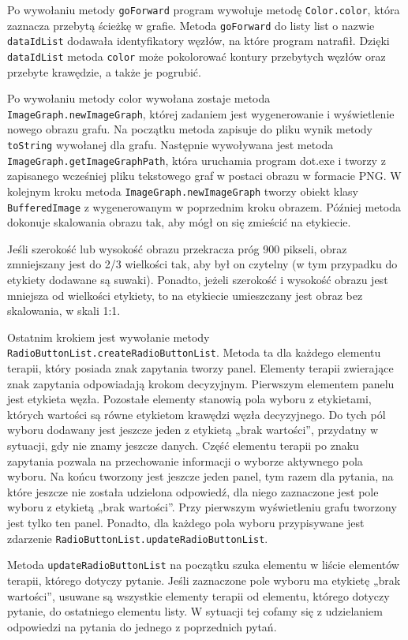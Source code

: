 Po wywołaniu metody \texttt{goForward} program wywołuje metodę \texttt{Color.color}, która zaznacza przebytą ścieżkę w grafie. Metoda \texttt{goForward} do listy list o nazwie \texttt{dataIdList} dodawała identyfikatory węzłów, na które program natrafił. Dzięki \texttt{dataIdList} metoda \texttt{color} może pokolorować kontury przebytych węzłów oraz przebyte krawędzie, a także je pogrubić. 
 
Po wywołaniu metody color wywołana zostaje metoda \texttt{ImageGraph.newImageGraph}, której zadaniem jest wygenerowanie i wyświetlenie nowego obrazu grafu. Na początku metoda zapisuje do pliku wynik metody \texttt{toString} wywołanej dla grafu. Następnie wywoływana jest metoda \texttt{ImageGraph.getImageGraphPath}, która uruchamia program dot.exe i tworzy z zapisanego wcześniej pliku tekstowego graf w postaci obrazu w formacie PNG. W kolejnym kroku metoda \texttt{ImageGraph.newImageGraph} tworzy obiekt klasy \texttt{BufferedImage} z wygenerowanym w poprzednim kroku obrazem. Później metoda dokonuje skalowania obrazu tak, aby mógł on się zmieścić na etykiecie. 

Jeśli szerokość lub wysokość obrazu przekracza próg 900 pikseli, obraz zmniejszany jest do 2/3 wielkości tak, aby był on czytelny (w tym przypadku do etykiety dodawane są suwaki). Ponadto, jeżeli szerokość i wysokość obrazu jest mniejsza od wielkości etykiety, to na etykiecie umieszczany jest obraz bez skalowania, w skali 1:1.
 
Ostatnim krokiem jest wywołanie metody \texttt{RadioButtonList.createRadioButtonList}. Metoda ta dla każdego elementu terapii, który posiada znak zapytania tworzy panel. Elementy terapii zwierające znak zapytania odpowiadają krokom decyzyjnym. Pierwszym elementem panelu jest etykieta węzła. Pozostałe elementy stanowią pola wyboru z etykietami, których wartości są równe etykietom krawędzi węzła decyzyjnego. Do tych pól wyboru dodawany jest jeszcze jeden z etykietą „brak wartości”, przydatny w sytuacji, gdy nie znamy jeszcze danych. Część elementu terapii po znaku zapytania pozwala na przechowanie informacji o wyborze aktywnego pola wyboru. Na końcu tworzony jest jeszcze jeden panel, tym razem dla pytania, na które jeszcze nie została udzielona odpowiedź, dla niego zaznaczone jest pole wyboru z etykietą „brak wartości”. Przy pierwszym wyświetleniu grafu tworzony jest tylko ten panel. Ponadto, dla każdego pola wyboru przypisywane jest zdarzenie \texttt{RadioButtonList.updateRadioButtonList}.

Metoda \texttt{updateRadioButtonList} na początku szuka elementu w liście elementów terapii, którego dotyczy pytanie. Jeśli zaznaczone pole wyboru ma etykietę „brak wartości”, usuwane są wszystkie elementy terapii od elementu, którego dotyczy pytanie, do ostatniego elementu listy. W sytuacji tej cofamy się z udzielaniem odpowiedzi na pytania do jednego z poprzednich pytań.

